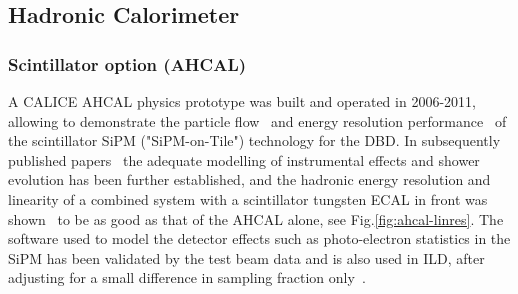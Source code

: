 \subsection{Hadronic Calorimeter}
\label{ild:sec:HCAL}

\subsubsection{Scintillator option (AHCAL)}

A CALICE AHCAL physics prototype was built and operated in 2006-2011, allowing to demonstrate the particle flow~\cite{Adloff:2011ha} and energy resolution performance~\cite{Adloff:2012gv} of the scintillator SiPM ("SiPM-on-Tile") technology for the DBD. In subsequently published papers~\cite{Adloff:2013vra,Adloff:2013kio,Adloff:2013jqa,Adloff:2014rya,Bilki:2014bga,Lucaci-Timoce:2013tkf,Price:2016sce} the adequate modelling of instrumental effects and shower evolution has been further established, and the hadronic energy resolution and linearity of a combined system with a scintillator tungsten ECAL in front was shown~\cite{Repond:2018flg} to be as good as that of the AHCAL alone, see Fig.\ref{fig:ahcal-linres}. The software used to model the detector effects such as photo-electron statistics in the SiPM has been validated by the test beam data and is also used in ILD, after adjusting for a small difference in sampling fraction only~\cite{Hartbrich:2016bbz}.
